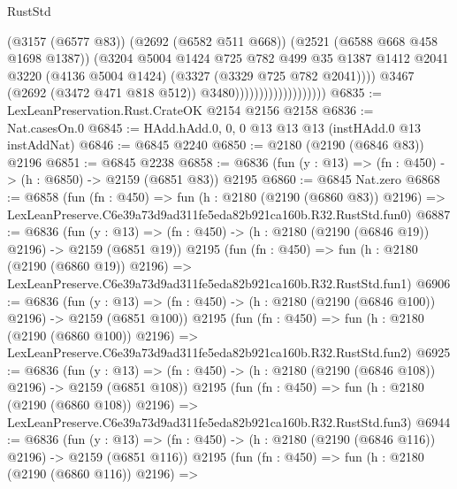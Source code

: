 \begin{lexlean}{RustStd}
\begin{coremodule}
                                            (@3157 (@6577 @83))
                                            (@2692 (@6582 @511 @668))
                                            (@2521 (@6588 @668 @458 @1698 @1387))
                                            (@3204
                                              @5004
                                              @1424
                                              @725
                                              @782
                                              @499
                                              @35
                                              @1387
                                              @1412
                                              @2041
                                              @3220
                                              (@4136 @5004 @1424)
                                              (@3327 (@3329 @725 @782 @2041))))
                                          @3467
                                          (@2692 (@3472 @471 @818 @512))
                                          @3480)))))))))))))))))))
@6835 := LexLeanPreservation.Rust.CrateOK @2154 @2156 @2158
@6836 := Nat.casesOn.{0}
@6845 := HAdd.hAdd.{0, 0, 0} @13 @13 @13 (instHAdd.{0} @13 instAddNat)
@6846 := @6845 @2240
@6850 := @2180 (@2190 (@6846 @83)) @2196
@6851 := @6845 @2238
@6858 := @6836 (fun (y : @13) => (fn : @450) -> (h : @6850) -> @2159 (@6851 @83)) @2195
@6860 := @6845 Nat.zero
@6868 := @6858
    (fun (fn : @450) =>
    fun (h : @2180 (@2190 (@6860 @83)) @2196) =>
    LexLeanPreserve.C6e39a73d9ad311fe5eda82b921ca160b.R32.RustStd.fun0)
@6887 := @6836
    (fun (y : @13) => (fn : @450) -> (h : @2180 (@2190 (@6846 @19)) @2196) -> @2159 (@6851 @19))
    @2195
    (fun (fn : @450) =>
    fun (h : @2180 (@2190 (@6860 @19)) @2196) =>
    LexLeanPreserve.C6e39a73d9ad311fe5eda82b921ca160b.R32.RustStd.fun1)
@6906 := @6836
    (fun (y : @13) => (fn : @450) -> (h : @2180 (@2190 (@6846 @100)) @2196) -> @2159 (@6851 @100))
    @2195
    (fun (fn : @450) =>
    fun (h : @2180 (@2190 (@6860 @100)) @2196) =>
    LexLeanPreserve.C6e39a73d9ad311fe5eda82b921ca160b.R32.RustStd.fun2)
@6925 := @6836
    (fun (y : @13) => (fn : @450) -> (h : @2180 (@2190 (@6846 @108)) @2196) -> @2159 (@6851 @108))
    @2195
    (fun (fn : @450) =>
    fun (h : @2180 (@2190 (@6860 @108)) @2196) =>
    LexLeanPreserve.C6e39a73d9ad311fe5eda82b921ca160b.R32.RustStd.fun3)
@6944 := @6836
    (fun (y : @13) => (fn : @450) -> (h : @2180 (@2190 (@6846 @116)) @2196) -> @2159 (@6851 @116))
    @2195
    (fun (fn : @450) =>
    fun (h : @2180 (@2190 (@6860 @116)) @2196) =>

\end{coremodule}
\end{lexlean}

